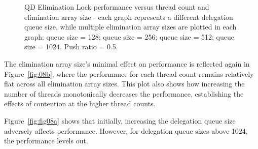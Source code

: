 \begin{figure}[]
\caption[]{QD Elimination Lock performance versus thread count and elimination array size - each graph represents a different delegation queue size, while multiple elimination array sizes are plotted in each graph:  queue size = 128;  queue size = 256;  queue size = 512;  queue size = 1024. Push ratio = 0.5.}
\label{fig:thrd_and_elsize}
\end{figure}

The elimination array size's minimal effect on performance is reflected again in Figure~\ref{fig:08b}, where the performance for each thread count remains relatively flat across all elimination array sizes. This plot also shows how increasing the number of threads monotonically decreases the performance, establishing the effects of contention at the higher thread counts.

Figure~\ref{fig:fig08a} shows that initially, increasing the delegation queue size adversely affects performance. However, for delegation queue sizes above 1024, the performance levels out.

